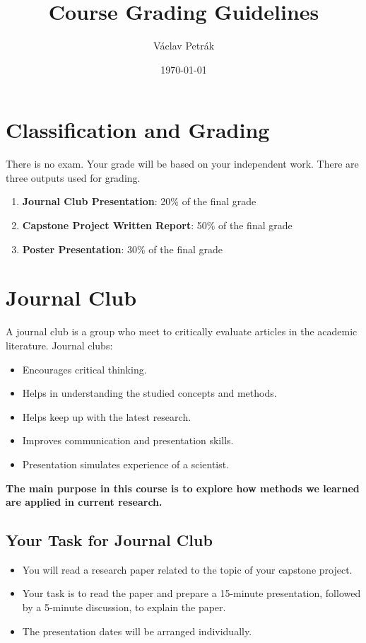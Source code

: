 \documentclass{article}
\title{Course Grading Guidelines}
\author{Václav Petrák} %
\date{\today}
\begin{document}
\maketitle

\section*{Classification and Grading}

There is no exam. Your grade will be based on your independent work. There are three outputs used for grading.

\begin{enumerate}
    \item \textbf{Journal Club Presentation}: 20\% of the final grade
    \item \textbf{Capstone Project Written Report}: 50\% of the final grade
    \item \textbf{Poster Presentation}: 30\% of the final grade
\end{enumerate}

\section{Journal Club}
A journal club is a group who meet to critically evaluate articles in the academic literature. Journal clubs:
\begin{itemize}
    \item Encourages critical thinking.
    \item Helps in understanding the studied concepts and methods.
    \item Helps keep up with the latest research.
    \item Improves communication and presentation skills.
    \item Presentation simulates experience of a scientist.
\end{itemize}
\textbf{The main purpose in this course is to explore how methods we learned are applied in current research.}

\subsection{Your Task for Journal Club}
\begin{itemize}
    \item You will read a research paper related to the topic of your capstone project.
    \item Your task is to read the paper and prepare a 15-minute presentation, followed by a 5-minute discussion, to explain the paper.
    \item The presentation dates will be arranged individually.
\end{itemize}
\end{document}
